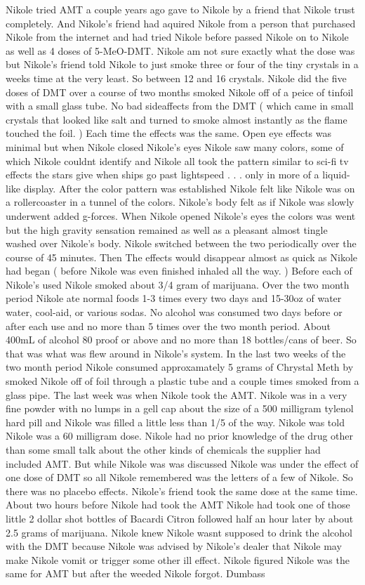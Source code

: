\documentclass[12pt]{book}
\begin{document}
Nikole tried AMT a couple years ago gave to Nikole by a friend that Nikole trust completely. And Nikole's friend had aquired Nikole from a person that purchased Nikole from the internet and had tried Nikole before passed Nikole on to Nikole as well as 4 doses of 5-MeO-DMT. Nikole am not sure exactly what the dose was but Nikole's friend told Nikole to just smoke three or four of the tiny crystals in a weeks time at the very least. So between 12 and 16 crystals. Nikole did the five doses of DMT over a course of two months smoked Nikole off of a peice of tinfoil with a small glass tube. No bad sideaffects from the DMT ( which came in small crystals that looked like salt and turned to smoke almost instantly as the flame touched the foil. ) Each time the effects was the same. Open eye effects was minimal but when Nikole closed Nikole's eyes Nikole saw many colors, some of which Nikole couldnt identify and Nikole all took the pattern similar to sci-fi tv effects the stars give when ships go past lightspeed . . .  only in more of a liquid-like display. After the color pattern was established Nikole felt like Nikole was on a rollercoaster in a tunnel of the colors. Nikole's body felt as if Nikole was slowly underwent added g-forces. When Nikole opened Nikole's eyes the colors was went but the high gravity sensation remained as well as a pleasant almost tingle washed over Nikole's body. Nikole switched between the two periodically over the course of 45 minutes. Then The effects would disappear almost as quick as Nikole had began ( before Nikole was even finished inhaled all the way. ) Before each of Nikole's used Nikole smoked about 3/4 gram of marijuana. Over the two month period Nikole ate normal foods 1-3 times every two days and 15-30oz of water water, cool-aid, or various sodas. No alcohol was consumed two days before or after each use and no more than 5 times over the two month period. About 400mL of alcohol 80 proof or above and no more than 18 bottles/cans of beer. So that was what was flew around in Nikole's system. In the last two weeks of the two month period Nikole consumed approxamately 5 grams of Chrystal Meth by smoked Nikole off of foil through a plastic tube and a couple times smoked from a glass pipe. The last week was when Nikole took the AMT. Nikole was in a very fine powder with no lumps in a gell cap about the size of a 500 milligram tylenol hard pill and Nikole was filled a little less than 1/5 of the way. Nikole was told Nikole was a 60 milligram dose. Nikole had no prior knowledge of the drug other than some small talk about the other kinds of chemicals the supplier had included AMT. But while Nikole was was discussed Nikole was under the effect of one dose of DMT so all Nikole remembered was the letters of a few of Nikole. So there was no placebo effects. Nikole's friend took the same dose at the same time. About two hours before Nikole had took the AMT Nikole had took one of those little 2 dollar shot bottles of Bacardi Citron followed half an hour later by about 2.5 grams of marijuana. Nikole knew Nikole wasnt supposed to drink the alcohol with the DMT because Nikole was advised by Nikole's dealer that Nikole may make Nikole vomit or trigger some other ill effect. Nikole figured Nikole was the same for AMT but after the weeded Nikole forgot. Dumbass 
\end{document}
